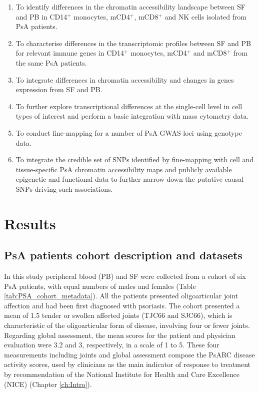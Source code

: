 \begin{enumerate}
\item To identify differences in the chromatin accessibility landscape between SF and PB in CD14$^+$ monocytes, mCD4$^+$, mCD8$^+$ and NK cells isolated from PsA patients.
\item To characterise differences in the transcriptomic profiles between SF and PB for relevant immune genes in CD14$^+$ monocytes, mCD4$^+$ and mCD8$^+$ from the same PsA patients.
\item To integrate differences in chromatin accessibility and changes in genes expression from SF and PB.  
\item To further explore transcriptional differences at the single-cell level in cell types of interest and perform a basic integration with mass cytometry data.
 \item To conduct fine-mapping for a number of PsA GWAS loci using genotype data.
\item To integrate the credible set of SNPs identified by fine-mapping with cell and tissue-specific PsA chromatin accessibility maps and publicly available epigenetic and functional data to further narrow down the putative causal SNPs driving such associations.
\end{enumerate}




\section{Results}
%

\subsection{PsA patients cohort description and datasets}
In this study peripheral blood (PB) and SF were collected from a cohort of six PsA patients, with equal numbers of males and females (Table \ref{tab:PSA_cohort_metadata}). All the patients presented oligoarticular joint affection and had been first diagnosed with psoriasis. The cohort presented a mean of 1.5 tender or swollen affected joints (TJC66 and SJC66), which is characteristic of the oligoarticular form of disease, involving four or fewer joints. Regarding global assessment, the mean scores for the patient and physician evaluation were 3.2 and 3, respectively, in a scale of 1 to 5. These four measurements including joints and global assessment compose the PsARC disease activity scores, used by clinicians as the main indicator of response to treatment by recommendation of the National Institute for Health and Care Excellence (NICE) (Chapter \ref{ch:Intro}). 

